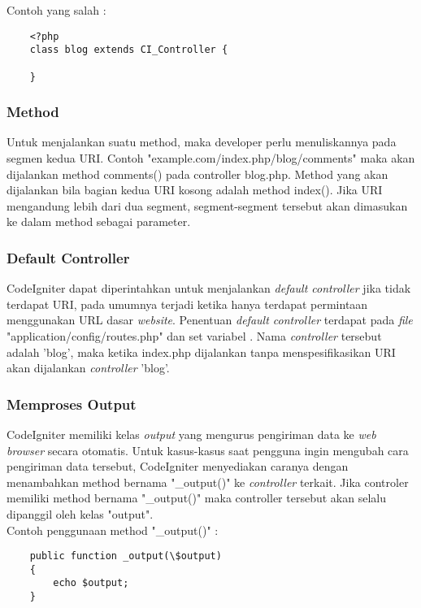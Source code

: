 Contoh yang salah :
\begin{lstlisting}
	<?php
	class blog extends CI_Controller {

	}
\end{lstlisting}
	\subsubsection{Method}
	Untuk menjalankan suatu method, maka developer perlu menuliskannya pada segmen kedua URI. Contoh "example.com/index.php/blog/comments" maka akan dijalankan method comments() pada controller blog.php. Method yang akan dijalankan bila bagian kedua URI kosong adalah method index(). Jika URI mengandung lebih dari dua segment, segment-segment tersebut akan dimasukan ke dalam method sebagai parameter.
	
	\subsubsection{Default Controller}
	CodeIgniter dapat diperintahkan untuk menjalankan \textit{default controller} jika tidak terdapat URI, pada umumnya terjadi ketika hanya terdapat permintaan menggunakan URL dasar \textit{website}. Penentuan \textit{default controller} terdapat pada \textit{file} "application/config/routes.php" dan set variabel . Nama \textit{controller} tersebut adalah 'blog', maka ketika index.php dijalankan tanpa menspesifikasikan URI akan dijalankan \textit{controller} 'blog'.
	
	\subsubsection{Memproses Output}
	CodeIgniter memiliki kelas \textit{output} yang mengurus pengiriman data ke \textit{web browser} secara otomatis. Untuk kasus-kasus saat pengguna ingin mengubah cara pengiriman data tersebut, CodeIgniter menyediakan caranya dengan menambahkan method bernama "\_output()" ke \textit{controller} terkait. Jika controler memiliki method bernama "\_output()" maka controller tersebut akan  selalu dipanggil oleh kelas "output".\\
Contoh penggunaan method "\_output()" : 
\begin{lstlisting}
	public function _output(\$output)
	{
        echo $output;
	}
\end{lstlisting}

